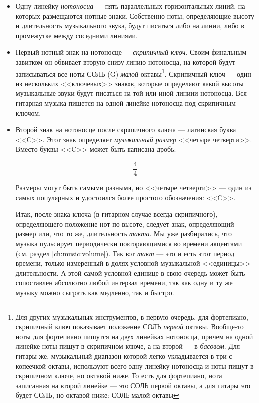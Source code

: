 \begin{itemize}
    \item Одну линейку \emph{нотоносца} --- пять параллельных горизонтальных линий, на которых размещаются нотные знаки. Собственно ноты, определяющие высоту и длительность музыкального звука, будут писаться либо на линии, либо в промежутке между соседними линиями.
    
    \item Первый нотный знак на нотоносце --- \emph{скрипичный ключ}. Своим финальным завитком он обвивает вторую снизу линию нотоносца, на которой будут записываться все ноты СОЛЬ (G) \emph{малой} октавы\footnote{Для других музыкальных инструментов, в первую очередь, для фортепиано, скрипичный ключ показывает положение СОЛЬ \emph{первой} октавы. Вообще-то ноты для фортепиано пишутся на двух линейках нотоносца, причем на одной линейке ноты пишут в скрипичном ключе, а на второй --- в \emph{басовом}. Для гитары же, музыкальный диапазон которой легко укладывается в три с копеечкой октавы, используют всего одну линейку нотоносца и ноты пишут в скрипичном ключе, но октавой ниже. То есть для фортепиано, нота записанная на второй линейке --- это СОЛЬ первой октавы, а для гитары это будет СОЛЬ, но октавой ниже: СОЛЬ малой октавы}. Скрипичный ключ --- один из нескольких <<ключевых>> знаков, которые определяют какой высоты музыкальные звуки будут писаться на той или иной линиии нотоносца. Вся гитарная музыка пишется на одной линейке нотоносца под скрипичным ключом.
    
    \item Второй знак на нотоносце после скрипичного ключа --- латинская буква <<C>>. Этот знак определяет \emph{музыкальный размер} <<четыре четверти>>. Вместо буквы <<C>> может быть написана дробь:
    
    \[\frac{4}{4}\]
        
    Размеры могут быть самыми разными, но <<четыре четверти>> --- один из самых популярных и удостоился более простого обозначения: <<C>>.
    
    Итак, после знака ключа (в гитарном случае всегда скрипичного), определяющего положение нот по высоте, следует знак, определяющий размер или, что то же, длительность \emph{такта}. Мы уже разбирались, что музыка пульсирует периодически повторяющимися во времени акцентами (см. раздел \ref{ch:music:volume}). Так вот \emph{такт} --- это и есть этот период времени, только измеренный в долях условной музыкальной <<единицы>> длительности. А этой самой условной единице в свою очередь может быть сопоставлен абсолютно любой интервал времени, так как одну и ту же музыку можно сыграть как медленно, так и быстро. 
    

\end{itemize}
